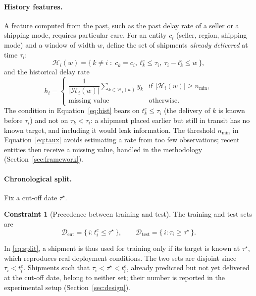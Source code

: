 \documentclass[11pt,a4paper]{article}
\theoremstyle{definition}
\newtheorem{contrainte}{Constraint}
\begin{document}
\paragraph{History features.} A feature computed from the past, such as the past delay rate of a seller or a shipping mode, requires particular care. For an entity $c_i$ (seller, region, shipping mode) and a window of width $w$, define the set of shipments \emph{already delivered} at time $\tau_i$:
\begin{equation}
  \mathcal{H}_i(w) = \bigl\{\, k \neq i \;:\; c_k = c_i,\ t_k^{e} \le \tau_i,\ \tau_i - t_k^{e} \le w \,\bigr\},
  \label{eq:hist}
\end{equation}
and the historical delay rate
\begin{equation}
  h_i =
  \begin{cases}
    \dfrac{1}{|\mathcal{H}_i(w)|} \displaystyle\sum_{k \in \mathcal{H}_i(w)} y_k & \text{if } |\mathcal{H}_i(w)| \ge n_{\min},\\[2ex]
    \text{missing value} & \text{otherwise.}
  \end{cases}
  \label{eq:taux}
\end{equation}
The condition in Equation~\eqref{eq:hist} bears on $t_k^{e} \le \tau_i$ (the delivery of $k$ is known before $\tau_i$) and not on $\tau_k < \tau_i$: a shipment placed earlier but still in transit has no known target, and including it would leak information. The threshold $n_{\min}$ in Equation~\eqref{eq:taux} avoids estimating a rate from too few observations; recent entities then receive a missing value, handled in the methodology (Section~\ref{sec:framework}).

\paragraph{Chronological split.} Fix a cut-off date $\tau^\star$.
\begin{contrainte}[Precedence between training and test]
\label{ctr:prec}
The training and test sets are
\begin{equation}
  \mathcal{D}_{\mathrm{ent}} = \{\, i : t_i^{e} \le \tau^\star \,\}, \qquad
  \mathcal{D}_{\mathrm{test}} = \{\, i : \tau_i \ge \tau^\star \,\}.
  \label{eq:split}
\end{equation}
\end{contrainte}
In \eqref{eq:split}, a shipment is thus used for training only if its target is known at $\tau^\star$, which reproduces real deployment conditions. The two sets are disjoint since $\tau_i < t_i^{e}$. Shipments such that $\tau_i < \tau^\star < t_i^{e}$, already predicted but not yet delivered at the cut-off date, belong to neither set; their number is reported in the experimental setup (Section~\ref{sec:design}).
\end{document}
